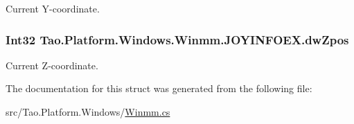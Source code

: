 Current Y-\/coordinate. 

\hypertarget{struct_tao_1_1_platform_1_1_windows_1_1_winmm_1_1_j_o_y_i_n_f_o_e_x_a78d8695dbaa84561cb76414a48604aea}{
\subsubsection[{dwZpos}]{\setlength{\rightskip}{0pt plus 5cm}Int32 {\bf Tao.Platform.Windows.Winmm.JOYINFOEX.dwZpos}}}
\label{struct_tao_1_1_platform_1_1_windows_1_1_winmm_1_1_j_o_y_i_n_f_o_e_x_a78d8695dbaa84561cb76414a48604aea}


Current Z-\/coordinate. 



The documentation for this struct was generated from the following file:\begin{DoxyCompactItemize}
\item 
src/Tao.Platform.Windows/\hyperlink{_winmm_8cs}{Winmm.cs}\end{DoxyCompactItemize}
